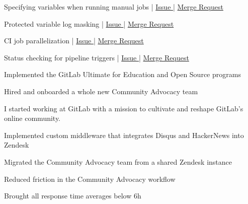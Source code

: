\documentclass[]{matija-resume}
\begin{document}
\begin{minipage}[t]{1.0\textwidth}
\begin{tightemize}
\item Specifying variables when running manual jobs | \href{https://gitlab.com/gitlab-org/gitlab-foss/-/issues/24935}{Issue } | \href{https://gitlab.com/gitlab-org/gitlab-foss/-/merge_requests/30485}{Merge Request }
\item Protected variable log masking | \href{https://gitlab.com/gitlab-org/gitlab-foss/-/issues/13784}{Issue } | \href{hhttps://gitlab.com/gitlab-org/gitlab-foss/-/merge_requests/25293}{Merge Request }
\item CI job parallelization | \href{https://gitlab.com/gitlab-org/gitlab-foss/-/issues/21480}{Issue } | \href{https://gitlab.com/gitlab-org/gitlab-foss/-/merge_requests/22631}{Merge Request }
\item Status checking for pipeline triggers | \href{https://gitlab.com/gitlab-org/gitlab/-/issues/11238}{Issue } | \href{https://gitlab.com/gitlab-org/gitlab/-/merge_requests/15580}{Merge Request }
\end{tightemize}
\sectionsep

\begin{tightemize}
\item Implemented the GitLab Ultimate for Education and Open Source programs
\item Hired and onboarded a whole new Community Advocacy team
\end{tightemize}
\sectionsep

\vspace{\topsep}
I started working at GitLab with a mission to cultivate and reshape GitLab's online community.
\vspace{\topsep}
\begin{tightemize}
\item Implemented custom middleware that integrates Disqus and HackerNews into Zendesk
\item Migrated the Community Advocacy team from a shared Zendesk instance
\item Reduced friction in the Community Advocacy workflow
\item Brought all response time averages below 6h
\end{tightemize}
\sectionsep


\end{minipage}
\end{document}
